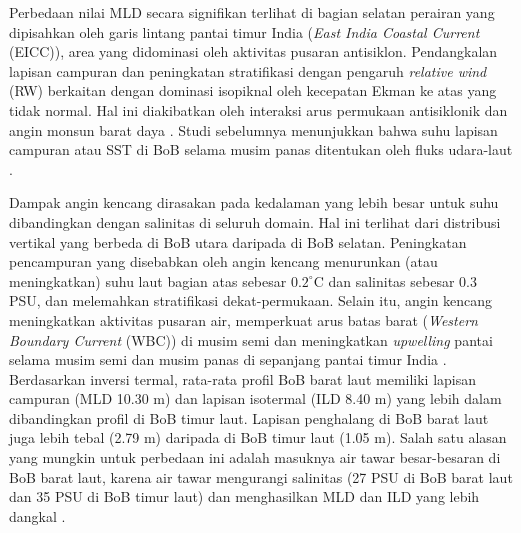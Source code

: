 \begin{spacing}{1.5}
	Perbedaan nilai MLD secara signifikan terlihat di bagian selatan perairan yang dipisahkan oleh garis lintang pantai timur India (\textit{East India Coastal Current} (EICC)), area yang didominasi oleh aktivitas pusaran antisiklon. Pendangkalan lapisan campuran dan peningkatan stratifikasi dengan pengaruh \textit{relative wind} (RW) berkaitan dengan dominasi isopiknal oleh kecepatan Ekman ke atas yang tidak normal. Hal ini diakibatkan oleh interaksi arus permukaan antisiklonik dan angin monsun barat daya . Studi sebelumnya menunjukkan bahwa suhu lapisan campuran atau SST di BoB selama musim panas ditentukan oleh fluks udara-laut . 
	
	Dampak angin kencang dirasakan pada kedalaman yang lebih besar untuk suhu dibandingkan dengan salinitas di seluruh domain. Hal ini terlihat dari distribusi vertikal yang berbeda di BoB utara daripada di BoB selatan. Peningkatan pencampuran yang disebabkan oleh angin kencang menurunkan (atau meningkatkan) suhu laut bagian atas sebesar $0.2^\circ$C dan salinitas sebesar 0.3 PSU, dan melemahkan stratifikasi dekat-permukaan. Selain itu, angin kencang meningkatkan aktivitas pusaran air, memperkuat arus batas barat (\textit{Western Boundary Current} (WBC)) di musim semi dan meningkatkan \textit{upwelling} pantai selama musim semi dan musim panas di sepanjang pantai timur India . Berdasarkan inversi termal, rata-rata profil BoB barat laut memiliki lapisan campuran (MLD 10.30 m) dan lapisan isotermal (ILD 8.40 m) yang lebih dalam dibandingkan profil di BoB timur laut. Lapisan penghalang di BoB barat laut juga lebih tebal (2.79 m) daripada di BoB timur laut (1.05 m). Salah satu alasan yang mungkin untuk perbedaan ini adalah masuknya air tawar besar-besaran di BoB barat laut, karena air tawar mengurangi salinitas (27 PSU di BoB barat laut dan 35 PSU di BoB timur laut) dan menghasilkan MLD dan ILD yang lebih dangkal . 
		

\end{spacing}
